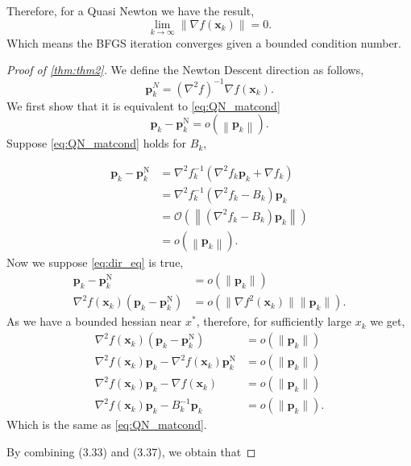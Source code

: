 \documentclass[12pt]{report}
\begin{document}
Therefore, for a Quasi Newton we have the result,
\[
	\lim_{k \to \infty} \|\nabla f(\bm x_k)\| = 0
	.\]
Which means the BFGS iteration converges given a bounded condition number.
\begin{proof}[Proof of \autoref{thm:thm2}]
	We define the Newton Descent direction as follows,
	\[
		\bm p_k^{N} = (\nabla^2f)^{-1} \nabla f(\bm x_k)
		.\]
	We first show that it is equivalent to \eqref{eq:QN_matcond}
	\begin{equation}
		\bm p_k-\bm p_k^{\mathrm{N}}=o\left(\left\|\bm p_k\right\|\right) \label{eq:dir_eq}.
	\end{equation}
	Suppose \eqref{eq:QN_matcond} holds for $B_k$,

	\[
		\begin{aligned}
			\bm p_k-\bm p_k^{\mathrm{N}} & =\nabla^2 f_k^{-1}\left(\nabla^2 f_k \bm p_k+\nabla f_k\right)               \\
			                             & =\nabla^2 f_k^{-1}\left(\nabla^2 f_k-B_k\right) \bm p_k                      \\
			                             & =\mathcal O\left(\left\|\left(\nabla^2 f_k-B_k\right) \bm p_k\right\|\right) \\
			                             & = o\left(\left\|\bm p_k\right\|\right).
		\end{aligned}
	\]
	Now we suppose \eqref{eq:dir_eq} is true,
	\begin{align*}
		\bm p_k-\bm p_k^{\mathrm{N}}                     & = o(\|\bm p_k\|) \\
		\nabla^2f(\bm x_k)(\bm p_k-\bm p_k^{\mathrm{N}}) & = o(\|\nabla f^2(\bm x_k)\|\|\bm p_k\|)
		.\end{align*}
	As we have a bounded hessian near $x^{*}$, therefore, for sufficiently large $x_k$ we get,
	\begin{align*}
		\nabla^2f(\bm x_k)(\bm p_k-\bm p_k^{\mathrm{N}})                  & = o(\|\bm p_k\|) \\
		\nabla^2f(\bm x_k)\bm p_k- \nabla^2f(\bm x_k)\bm p_k^{\mathrm{N}} & = o(\|\bm p_k\|) \\
		\nabla^2f(\bm x_k)\bm p_k- \nabla f(\bm x_k)                      & = o(\|\bm p_k\|) \\
		\nabla^2f(\bm x_k)\bm p_k- B_k^{-1}\bm p_k                        & = o(\|\bm p_k\|)
		.\end{align*}
	Which is the same as \eqref{eq:QN_matcond}.

	By combining (3.33) and (3.37), we obtain that


\end{proof}
\end{document}
